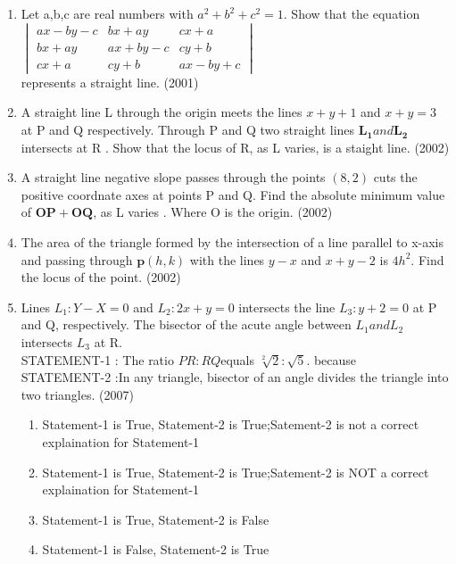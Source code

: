 \documentclass[12pt]{article}
\let\vec\mathbf
\begin{document}
\begin{enumerate}
\item Let a,b,c are real numbers with $a^2+b^2+c^2=1$. Show that the equation\\ 
$\begin{vmatrix}
 ax-by-c & bx+ay   & cx+a\\
 bx+ay   & ax+by-c & cy+b\\
 cx+a    & cy+b    & ax-by+c
\end{vmatrix}$ \\
represents a straight line.    (2001)
\item A straight line L through the origin meets the lines $x+y+1$ and $x+y=3$ at P and Q respectively. Through  P and Q two straight lines $\vec{L_1} and \vec{L_2}$ intersects at R . Show that the locus of R, as L varies, is a staight line. (2002)\\
\item A straight line negative slope passes through the points $(8,2)$ cuts the positive 
coordnate axes at points P and Q. Find the absolute minimum value of $\vec{OP}+\vec{OQ}$, as L varies . Where O is the origin. (2002)\\
\item The area of the triangle formed by the intersection of a line parallel to x-axis and passing through $\vec{p}(h,k)$ with the lines $y-x$ and $x+y-2$ is $4h^2$. Find the locus of the point. (2002)\\

\item Lines $L_1: Y-X=0$ and $L_2 :2x+y=0$ intersects the line $L_3:y+2=0$ at P and Q, respectively. The bisector of the acute angle between $L_1 and L_2$ intersects $L_3$ at R.\\
STATEMENT-1 : The ratio $PR:RQ$equals $\sqrt[2]{2}:\sqrt{5}$. because \\
STATEMENT-2 :In any triangle, bisector of an angle divides the triangle into two triangles. (2007)
\begin{enumerate}
\item Statement-1 is True, Statement-2 is True;Satement-2 is not a correct explaination for Statement-1
\item Statement-1 is True, Statement-2 is True;Satement-2 is NOT a correct explaination for Statement-1
\item Statement-1 is True, Statement-2 is False
\item Statement-1 is False, Statement-2 is True
\end{enumerate}
\iffalse
\end{enumerate}
\end{document}
